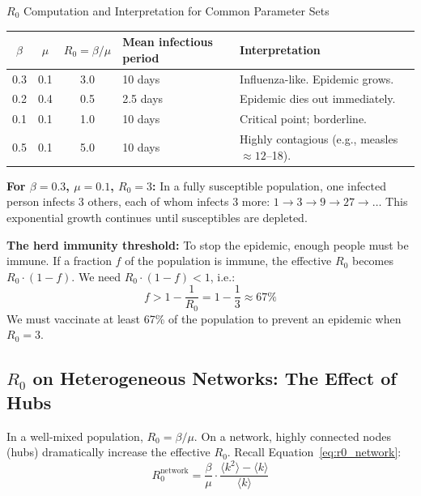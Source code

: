 \begin{examplebox}{$R_0$ Computation and Interpretation for Common Parameter Sets}
\begin{center}
\begin{tabular}{cccll}
\toprule
$\beta$ & $\mu$ & $R_0 = \beta/\mu$ & Mean infectious period & Interpretation \\
\midrule
0.3 & 0.1 & 3.0 & 10 days & Influenza-like. Epidemic grows. \\
0.2 & 0.4 & 0.5 & 2.5 days & Epidemic dies out immediately. \\
0.1 & 0.1 & 1.0 & 10 days & Critical point; borderline. \\
0.5 & 0.1 & 5.0 & 10 days & Highly contagious (e.g., measles $\approx 12$--18). \\
\bottomrule
\end{tabular}
\end{center}

\textbf{For $\beta = 0.3$, $\mu = 0.1$, $R_0 = 3$:} In a fully susceptible population, one infected person infects 3 others, each of whom infects 3 more: $1 \to 3 \to 9 \to 27 \to \ldots$ This exponential growth continues until susceptibles are depleted.

\textbf{The herd immunity threshold:} To stop the epidemic, enough people must be immune. If a fraction $f$ of the population is immune, the effective $R_0$ becomes $R_0 \cdot (1-f)$. We need $R_0 \cdot (1-f) < 1$, i.e.:
\[
f > 1 - \frac{1}{R_0} = 1 - \frac{1}{3} \approx 67\%
\]
We must vaccinate at least 67\% of the population to prevent an epidemic when $R_0 = 3$.
\end{examplebox}

\subsection{$R_0$ on Heterogeneous Networks: The Effect of Hubs}

In a well-mixed population, $R_0 = \beta/\mu$. On a network, highly connected nodes (hubs) dramatically increase the effective $R_0$. Recall Equation~\eqref{eq:r0_network}:
\[
R_0^{\mathrm{network}} = \frac{\beta}{\mu} \cdot \frac{\langle k^2 \rangle - \langle k \rangle}{\langle k \rangle}
\]

